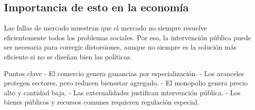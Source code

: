 \subsection{Importancia de esto en la economía}

Las fallas de mercado muestran que el mercado no siempre resuelve eficientemente todos los problemas sociales. Por eso, la intervención pública puede ser necesaria para corregir distorsiones, aunque no siempre es la solución más eficiente si no se diseñan bien las políticas.

\begin{resumen}{Puntos clave}
- El comercio genera ganancias por especialización.
- Los aranceles protegen sectores, pero reducen bienestar agregado.
- El monopolio genera precio alto y cantidad baja.
- Las externalidades justifican intervención pública.
- Los bienes públicos y recursos comunes requieren regulación especial.
\end{resumen}
